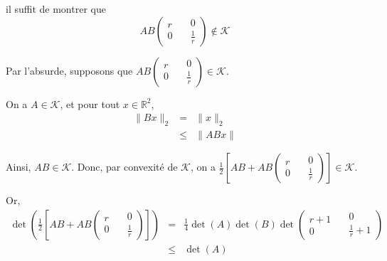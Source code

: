 il suffit de montrer que
\[ A B \left( \begin{array}{c}
     r\\
     0
   \end{array} \quad \begin{array}{c}
     0\\
     \frac{1}{r}
   \end{array} \right) \text{} \nin \mathcal{K} \]


Par l'absurde, supposons que $A B \left( \begin{array}{c}
  r\\
  0
\end{array} \quad \begin{array}{c}
  0\\
  \frac{1}{r}
\end{array} \right) \text{} \in \mathcal{K}$.

On a $A \in \mathcal{K}$, et pour tout $x \in \mathbb{R}^2$,
\begin{eqnarray*}
  \| B  x \|_2 & = & \| x \|_2\\
  & \leqslant & \| A B  x \|
\end{eqnarray*}


Ainsi, $A B \in \mathcal{K}$. Donc, par convexit{\'e} de $\mathcal{K}$, on a
$\frac{1}{2} \left[ A B + A B \left( \begin{array}{c}
  r\\
  0
\end{array} \quad \begin{array}{c}
  0\\
  \frac{1}{r}
\end{array} \right) \right] \in \mathcal{K}$.

Or,
\begin{eqnarray*}
  \det \left( \frac{1}{2} \left[ A B + A B \left( \begin{array}{c}
    r\\
    0
  \end{array} \quad \begin{array}{c}
    0\\
    \frac{1}{r}
  \end{array} \right) \right] \right) & = & \frac{1}{4} \det (A) \det (B) \det
  \left( \begin{array}{c}
    r + 1\\
    0
  \end{array} \quad \begin{array}{c}
    0\\
    \frac{1}{r} + 1
  \end{array} \right)\\
  & \leqslant & \det (A)
\end{eqnarray*}


